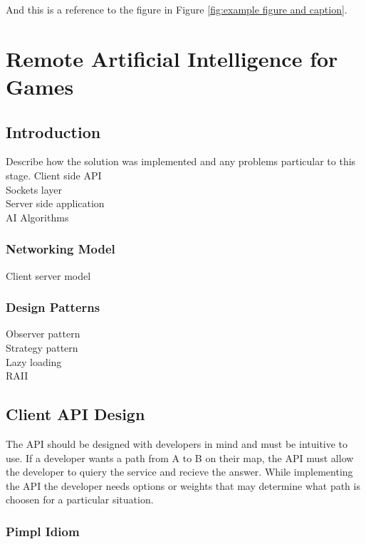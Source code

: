 \documentclass[12pt,a4paper,titlepage]{article}
\begin{document}
And this is a reference to the figure in Figure \ref{fig:example figure and caption}.

\section{Remote Artificial Intelligence for Games}

\subsection{Introduction}

Describe how the solution was implemented and any problems particular to this stage.
Client side API\\
Sockets layer\\
Server side application\\
AI Algorithms\\

\subsubsection{Networking Model}

Client server model\\

\subsubsection{Design Patterns}
Observer pattern\\
Strategy pattern\\
Lazy loading\\
RAII\\

\subsection{Client API Design}
\label{section:clientapidesign}

The API should be designed with developers in mind and must be intuitive to use. If a developer wants a path from A to B on their map, the API must allow the developer to quiery the service and recieve the answer. While implementing the API the developer needs options or weights that may determine what path is choosen for a particular situation. 

\subsubsection{Pimpl Idiom}
\end{document}
